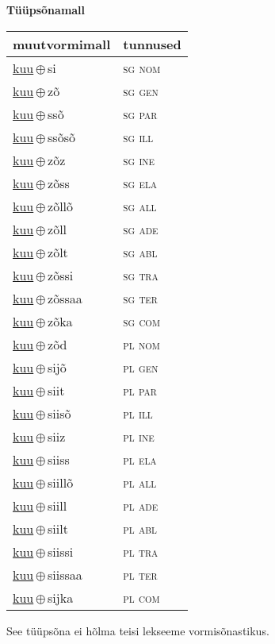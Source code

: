 

\vspace{3.5em}
\noindent \begin{minipage}{\textwidth}
\noindent \textbf{Tüüpsõnamall \,}\\

\begin{sideways}
\begin{tabular}{l l}
muutvormimall & tunnused \\
\hline
\underline{kuu}\,$\oplus$\,si & \textsc{ sg nom } \\
\underline{kuu}\,$\oplus$\,zõ & \textsc{ sg gen } \\
\underline{kuu}\,$\oplus$\,ssõ & \textsc{ sg par } \\
\underline{kuu}\,$\oplus$\,ssõsõ & \textsc{ sg ill } \\
\underline{kuu}\,$\oplus$\,zõz & \textsc{ sg ine } \\
\underline{kuu}\,$\oplus$\,zõss & \textsc{ sg ela } \\
\underline{kuu}\,$\oplus$\,zõllõ & \textsc{ sg all } \\
\underline{kuu}\,$\oplus$\,zõll & \textsc{ sg ade } \\
\underline{kuu}\,$\oplus$\,zõlt & \textsc{ sg abl } \\
\underline{kuu}\,$\oplus$\,zõssi & \textsc{ sg tra } \\
\underline{kuu}\,$\oplus$\,zõssaa & \textsc{ sg ter } \\
\underline{kuu}\,$\oplus$\,zõka & \textsc{ sg com } \\
\underline{kuu}\,$\oplus$\,zõd & \textsc{ pl nom } \\
\underline{kuu}\,$\oplus$\,sijõ & \textsc{ pl gen } \\
\underline{kuu}\,$\oplus$\,siit & \textsc{ pl par } \\
\underline{kuu}\,$\oplus$\,siisõ & \textsc{ pl ill } \\
\underline{kuu}\,$\oplus$\,siiz & \textsc{ pl ine } \\
\underline{kuu}\,$\oplus$\,siiss & \textsc{ pl ela } \\
\underline{kuu}\,$\oplus$\,siillõ & \textsc{ pl all } \\
\underline{kuu}\,$\oplus$\,siill & \textsc{ pl ade } \\
\underline{kuu}\,$\oplus$\,siilt & \textsc{ pl abl } \\
\underline{kuu}\,$\oplus$\,siissi & \textsc{ pl tra } \\
\underline{kuu}\,$\oplus$\,siissaa & \textsc{ pl ter } \\
\underline{kuu}\,$\oplus$\,sijka & \textsc{ pl com } \\
\end{tabular}
\end{sideways}
\label{tab:tüüpsõnamall-kuusi}

\end{minipage}

 
\vspace{1em}
\noindent See tüüpsõna ei hõlma teisi lekseeme vormi\-sõnastikus.
